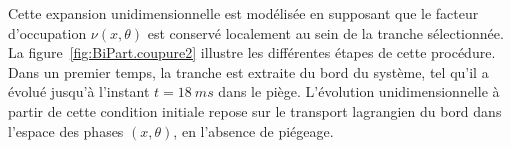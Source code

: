 %	
%	
%	 
%	 
%	 
%	 
%	 
%	 
%

\medskip

%
%
%
%

Cette expansion unidimensionnelle est modélisée en supposant que le facteur d’occupation $\nu(x,\theta)$ est conservé localement au sein de la tranche sélectionnée. La figure~\ref{fig:BiPart.coupure2} illustre les différentes étapes de cette procédure.
Dans un premier temps, la tranche est extraite du bord du système, tel qu’il a évolué jusqu’à l’instant $t = 18~ms$ dans le piège. L’évolution unidimensionnelle à partir de cette condition initiale repose sur le transport lagrangien du bord dans l’espace des phases $(x,\theta)$, en l’absence de piégeage.

